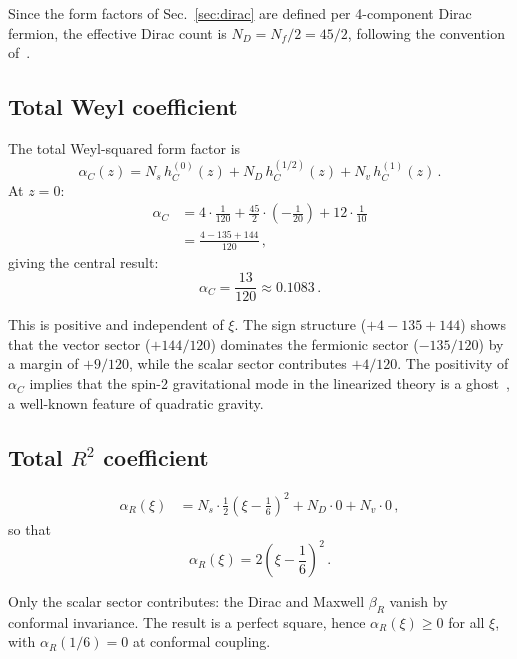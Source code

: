 \documentclass[aps,prd,twocolumn,superscriptaddress,nofootinbib,floatfix]{revtex4-2}
\theoremstyle{definition}
\theoremstyle{remark}
\begin{document}
Since the form factors of Sec.~\ref{sec:dirac} are defined per 4-component
Dirac fermion, the effective Dirac count is $N_D = N_f/2 = 45/2$, following the
convention of~\cite{Codello:2008vh}.

\subsection{Total Weyl coefficient}

The total Weyl-squared form factor is
\begin{equation}
  \alpha_C(z) = N_s\,h_C^{(0)}(z) + N_D\,h_C^{(1/2)}(z)
    + N_v\,h_C^{(1)}(z)\,.
  \label{eq:alphaC-z}
\end{equation}
At $z = 0$:
\begin{align}
  \alpha_C &= 4 \cdot \frac{1}{120}
    + \frac{45}{2}\cdot\!\left(-\frac{1}{20}\right)
    + 12 \cdot \frac{1}{10} \nonumber\\
  &= \frac{4 - 135 + 144}{120}\,,
  \label{eq:alphaC-sum}
\end{align}
giving the central result:
\begin{equation}
  \boxed{\alpha_C = \frac{13}{120} \approx 0.1083\,.}
  \label{eq:alphaC}
\end{equation}

This is positive and independent of $\xi$. The sign structure
($+4 - 135 + 144$) shows that the vector sector ($+144/120$) dominates the
fermionic sector ($-135/120$) by a margin of $+9/120$, while the scalar sector
contributes $+4/120$. The positivity of $\alpha_C$ implies that the spin-2
gravitational mode in the linearized theory is a ghost~\cite{Stelle:1976gc}, a
well-known feature of quadratic gravity.

\subsection{Total \texorpdfstring{$R^2$}{R2} coefficient}

\begin{align}
  \alpha_R(\xi) &= N_s \cdot \frac{1}{2}\!\left(\xi - \frac{1}{6}\right)^{\!2}
    + N_D \cdot 0 + N_v \cdot 0\,,
\end{align}
so that
\begin{equation}
  \boxed{\alpha_R(\xi) = 2\!\left(\xi - \frac{1}{6}\right)^{\!2}\,.}
  \label{eq:alphaR}
\end{equation}

Only the scalar sector contributes: the Dirac and Maxwell $\beta_R$ vanish by
conformal invariance. The result is a perfect square, hence
$\alpha_R(\xi) \geq 0$ for all $\xi$, with $\alpha_R(1/6) = 0$ at conformal
coupling.
\end{document}

